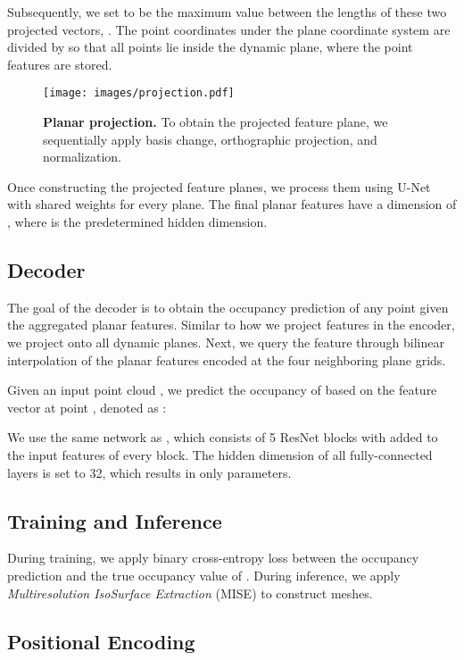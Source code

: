 \documentclass[10pt,twocolumn,letterpaper]{article}
\newcommand{\boldparagraph}[1]{\vspace{0.2cm}\noindent{\bf #1:} }
\begin{document}
Subsequently, we set  to be the maximum value between the lengths of these two projected vectors, .
The point coordinates under the plane coordinate system are divided by  so that all points lie inside the dynamic plane, where the point features are stored.


\begin{figure}[!t]
\centering
\texttt{[image: images/projection.pdf]}
\caption{\textbf{Planar projection.} To obtain the projected feature plane, we sequentially apply basis change, orthographic projection, and normalization.}
\label{fig:projection}
\end{figure}

Once constructing the projected feature planes, we process them using U-Net \cite{unet} with shared weights for every plane. The final planar features have a dimension of , where  is the predetermined hidden dimension. 

\subsection{Decoder} \label{sec:decoder}

The goal of the decoder is to obtain the occupancy prediction of any point  given the aggregated planar features. Similar to how we project features in the encoder, we project  onto all dynamic planes. Next, we query the feature
through bilinear interpolation of the planar features encoded at the four neighboring plane grids.

\boldparagraph{Occupancy prediction} Given an input point cloud , we predict the occupancy of  based on the feature vector at point , denoted as :


We use the same network as \cite{niemeyer2020differentiable}, which consists of 5 ResNet blocks with  added to the input features of every block. The hidden dimension of all fully-connected layers is set to 32, which results in only  parameters.

\subsection{Training and Inference}\label{sec:training}
During training, we apply binary cross-entropy loss between the occupancy prediction  and the true occupancy value of . During inference, we apply \emph{Multiresolution IsoSurface Extraction} (MISE) \cite{mescheder2018occupancy} to construct meshes.

\subsection{Positional Encoding}
\end{document}
